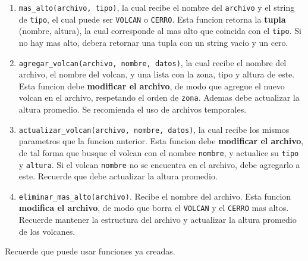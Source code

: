 \begin{enumerate}
	\item \texttt{mas\_alto(archivo, tipo)}, la cual recibe el nombre del \texttt{archivo} y el string de \texttt{tipo}, el cual puede ser \texttt{VOLCAN} o \texttt{CERRO}. Esta funcion retorna la \textbf{tupla} (nombre, altura), la cual corresponde al mas alto que coincida con el \texttt{tipo}. Si no hay mas alto, debera retornar una tupla con un string vacio y un cero.

	\item \texttt{agregar\_volcan(archivo, nombre, datos)}, la cual recibe el nombre del archivo, el nombre del volcan, y una lista con la zona, tipo y altura de este. Esta funcion debe \textbf{modificar el archivo}, de modo que agregue el nuevo volcan en el archivo, respetando el orden de \texttt{zona}. Ademas debe actualizar la altura promedio. Se recomienda el uso de archivos temporales.

	\item \texttt{actualizar\_volcan(archivo, nombre, datos)}, la cual recibe los mismos parametros que la funcion anterior. Esta funcion debe \textbf{modificar el archivo}, de tal forma que busque el volcan con el nombre \texttt{nombre}, y actualice su \texttt{tipo} y \texttt{altura}. Si el volcan \texttt{nombre} no se encuentra en el archivo, debe agregarlo a este. Recuerde que debe actualizar la altura promedio.

	\item \texttt{eliminar\_mas\_alto(archivo)}. Recibe el nombre del archivo. Esta funcion \textbf{modifica el archivo}, de modo que borra el \texttt{VOLCAN} y el \texttt{CERRO} mas altos. Recuerde mantener la estructura del archivo y actualizar la altura promedio de los volcanes.
\end{enumerate}

Recuerde que puede usar funciones ya creadas.
